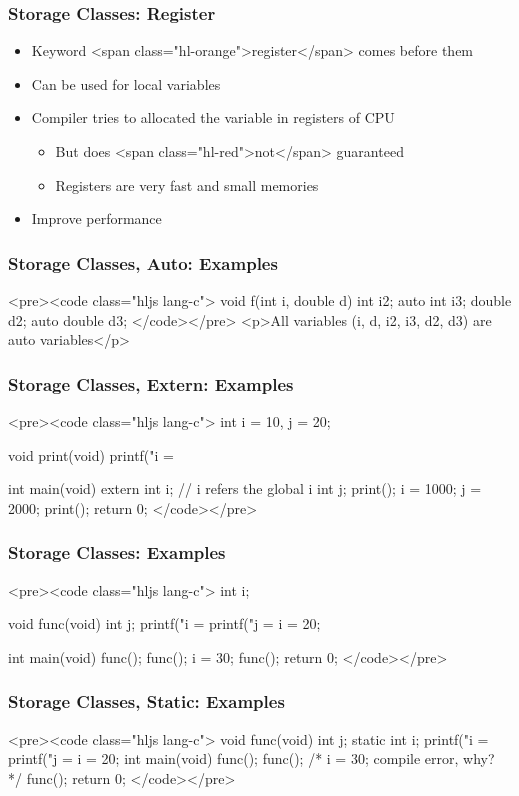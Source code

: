 \documentclass{../c-lecture}
\begin{document}
\begin{frame}
  \frametitle{Storage Classes: Register}
  \begin{itemize}
    \item Keyword <span class="hl-orange">register</span> comes before them
    \item Can be used for local variables
    \item Compiler tries to allocated the variable in registers of CPU
    \begin{itemize}
      \item But does <span class="hl-red">not</span> guaranteed
      \item Registers are very fast and small memories
    \end{itemize}
    \item Improve performance
  \end{itemize}
\end{frame}
\begin{frame}
  \frametitle{Storage Classes, Auto: Examples}
  <pre><code class="hljs lang-c">
void f(int i, double d){
  int i2;
  auto int i3;
  double d2;
  auto double d3;
}
  </code></pre>
  <p>All variables (i, d, i2, i3, d2, d3) are auto variables</p>
\end{frame}
\begin{frame}
  \frametitle{Storage Classes, Extern: Examples}
  <pre><code class="hljs lang-c">
int i = 10, j = 20;

void print(void){
  printf("i = %
}

int main(void){
  extern int i; // i refers the global i
  int j;
  print();
  i = 1000;
  j = 2000;
  print();
  return 0;
}
  </code></pre>
\end{frame}
\begin{frame}
  \frametitle{Storage Classes: Examples}
  <pre><code class="hljs lang-c">
int i;

void func(void){
  int j;
  printf("i = %
  printf("j = %
  i = 20;
}

int main(void){
  func();
  func();
  i = 30;
  func();
  return 0;
}
  </code></pre>
\end{frame}
\begin{frame}
  \frametitle{Storage Classes, Static: Examples}
  <pre><code class="hljs lang-c">
void func(void){
  int j;
  static int i;
  printf("i = %
  printf("j = %
  i = 20;
}
int main(void){
  func();
  func();
  /* i = 30; compile error, why? */
  func();
  return 0;
}
  </code></pre>
\end{frame}
\end{document}
